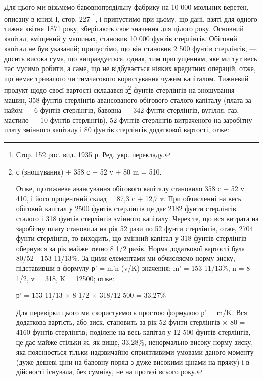 Для цього ми візьмемо бавовнопрядільну фабрику на 10 000
мюльних веретен, описану в книзі І, стор. 227 \footnote*{
Стор. 152 рос. вид. 1935 р. Ред. укр. перекладу.
}, і припустимо
при цьому, що дані, взяті для одного тижня квітня 1871 року,
зберігають своє значення для цілого року. Основний капітал, вміщений
у машинах, становив 10 000 фунтів стерлінгів. Обіговий
капітал не був указаний; припустімо, що він становив 2 500 фунтів
стерлінгів, — досить висока сума, що виправдується, однак, тим
припущенням, яке ми тут весь час мусимо робити, а саме, що
не відбувається ніяких кредитних операцій, отже, що немає
тривалого чи тимчасового користування чужим капіталом. Тижневий
продукт щодо своєї вартості складався з\footnote{
с (зношування) + 358 с + 52 v + 80 m = 510.

Отже, щотижневе авансування обігового капіталу становило
358 с + 52 v = 410, і його процентний склад = 87,3 с + 12,7 v. При
обчисленні на весь обіговий капітал у 2500 фунтів стерлінгів
це дає 2182 фунти стерлінгів сталого і 318 фунтів стерлінгів
змінного капіталу. Через те, що вся витрата на заробітну плату
становила на рік 52 рази по 52 фунти стерлінгів, отже, 2704 фунти
стерлінгів, то виходить, що змінний капітал у 318 фунтів стерлінгів
обернувся за рік майже точно 8 1/2 разів. Норма додаткової
вартості була  80/52—153 11/13\%. За цими елементами ми обчисляємо
норму зиску, підставивши в формулу р' = m'n (v/K) значення:
m' = 153 11/13\%, n = 8 1/2, v = 318, K = 12500; отже:

р' = 153 11/13 × 8 1/2 × 318/12 500 = 33,27\%

Для перевірки цього ми скористуємось простою формулою
р' = m/K. Вся додаткова вартість, або зиск, становить за рік
52 фунти стерлінгів × 80 = 4160 фунтів стерлінгів; поділене на
весь капітал у 12 500 фунтів стерлінгів, це дає майже стільки ж, як
вище, 33,28\%, ненормально високу норму зиску, яка пояснюється
тільки надзвичайно сприятливими умовами даного моменту (дуже
дешеві ціни на бавовну поряд з дуже високими цінами на пряжу)
і в дійсності існувала, без сумніву, не на протязі всього року.
} фунтів стерлінгів
на зношування машин, 358 фунтів стерлінгів авансованого
обігового сталого капіталу (плата за найом — 6 фунтів стерлінгів,
бавовна — 342 фунти стерлінгів, вугілля, газ, мастило — 10 фунтів
стерлінгів), 52 фунтів стерлінгів витраченого на заробітну
плату змінного капіталу і 80 фунтів стерлінгів додаткової вартості,
отже:
